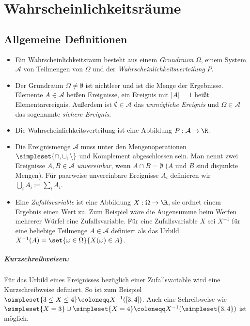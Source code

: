 \chapter{Wahrscheinlichkeitsräume}

\section{Allgemeine Definitionen}
\begin{itemize}
	\item Ein Wahrscheinlichkeitsraum besteht aus einem \emph{Grundraum} $\Omega$, einem System $\mathcal A$ von Teilmengen von $\Omega$ und der \emph{Wahrscheinlichkeitsverteilung} $P$.

	\item Der Grundraum $\Omega\neq \emptyset$ ist nichtleer und ist die Menge der Ergebnisse. Elemente $A\in\mathcal A$ heißen Ereignisse, ein Ereignis mit $|A|=1$ heißt Elementarereignis. Außerdem ist $\emptyset\in\mathcal A$ das \emph{unmögliche Ereignis} und $\Omega\in\mathcal A$ das sogenannte \emph{sichere Ereignis}.

	\item Die Wahrscheinlichkeitsverteilung ist eine Abbildung $P:\mathcal A\rightarrow \R$.

	\item Die Ereignismenge $\mathcal A$ muss unter den Mengenoperationen $\simpleset{\cap, \cup, \setminus}$ und Komplement abgeschlossen sein. Man nennt zwei Ereignisse $A, B\in\mathcal A$ \emph{unvereinbar}, wenn $A\cap B=\emptyset$ ($A$ und $B$ sind disjunkte Mengen). Für paarweise unvereinbare Ereignisse $A_i$ definieren wir $\bigcup_{i} A_i\coloneqq \sum_{i} A_i$.


	\item Eine \emph{Zufallsvariable} ist eine Abbildung $X:\Omega\rightarrow \R$, sie ordnet einem Ergebnis einen Wert zu. Zum Beispiel wäre die Augensumme beim Werfen mehrerer Würfel eine Zufallsvariable. Für eine Zufallsvariable $X$ sei $X^{-1}$ für eine beliebige Teilmenge $A\in\mathcal A$ definiert als das Urbild $X^{-1}(A)=\set{\omega\in\Omega}{X(\omega)\in A}$.
\end{itemize}


\paragraph{Kurzschreibweisen:}\label{Kurzschreibweisen1}
Für das Urbild eines Ereignisses bezüglich einer Zufallsvariable wird eine Kurzschreibweise definiert. So ist zum Beispiel $\simpleset{3\leq X\leq 4}\coloneqq X^{-1}([3,4])$. Auch eine Schreibweise wie $\simpleset{X=3}\cup\simpleset{X=4}\coloneqq X^{-1}(\simpleset{3,4})$ ist möglich.


